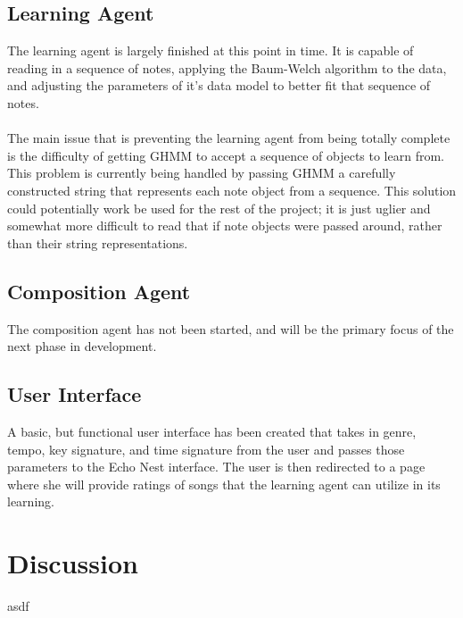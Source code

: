 \documentclass{article}
\begin{document}
\subsection{Learning Agent}
The learning agent is largely finished at this point in time. It is capable of reading in a sequence
of notes, applying the Baum-Welch algorithm to the data, and adjusting the parameters of it's data
model to better fit that sequence of notes.\\
\\
The main issue that is preventing the learning agent from being totally complete is the difficulty
of getting GHMM to accept a sequence of objects to learn from. This problem is currently being
handled by passing GHMM a carefully constructed string that represents each note object from a 
sequence. This solution could potentially work be used for the rest of the project; it is just
uglier and somewhat more difficult to read that if note objects were passed around, rather than
their string representations.

\subsection{Composition Agent}
The composition agent has not been started, and will be the primary focus of the next phase in development.

\subsection{User Interface}
A basic, but functional user interface has been created that takes in genre, tempo, key signature, and time
signature from the user and passes those parameters to the Echo Nest interface. The user is then redirected
to a page where she will provide ratings of songs that the learning agent can utilize in its learning.

\section{Discussion}
asdf



\end{document}
